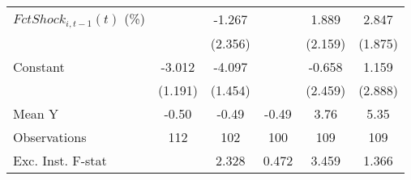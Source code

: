 {\begin{tabular}{l*{5}{c}}
\addlinespace
$ FctShock_{i,t-1}(t)$ (\%)&                     &      -1.267         &                     &       1.889         &       2.847         \\
                    &                     &     (2.356)         &                     &     (2.159)         &     (1.875)         \\
\addlinespace
Constant            &      -3.012\sym{**} &      -4.097\sym{**} &                     &      -0.658         &       1.159         \\
                    &     (1.191)         &     (1.454)         &                     &     (2.459)         &     (2.888)         \\
\midrule
Mean Y              &       -0.50         &       -0.49         &       -0.49         &        3.76         &        5.35         \\
Observations        &         112         &         102         &         100         &         109         &         109         \\
Exc. Inst. F-stat   &                     &       2.328         &       0.472         &       3.459         &       1.366         \\
\bottomrule
\end{tabular}
}
